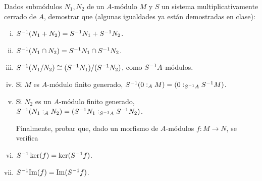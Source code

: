\documentclass[../../../main.tex]{subfiles}
\begin{document}
\setcounter{exercici}{64}
\begin{exercici}
Dados submódulos $N_1, N_2$ de un $A$-módulo $M$ y $S$ un sistema multiplicativamente cerrado de $A$, demostrar que (algunas igualdades ya están demostradas en clase):
\begin{enumerate}[(i)]
    \item $S^{-1} (N_1+N_2) = S^{-1} N_1+S^{-1} N_2$.
    \item $S^{-1} (N_1\cap N_2) = S^{-1} N_1\cap S^{-1} N_2$.
    \item $S^{-1} (N_1/N_2) \cong (S^{-1} N_1)/(S^{-1} N_2)$, como $S^{-1} A$-módulos.
    \item Si $M$ es $A$-módulo finito generado, $S^{-1}(0:_{A}M) = (0:_{S^{-1} A}S^{-1} M)$.
    \item Si $N_2$ es un $A$-módulo finito generado, $S^{-1}(N_1:_{A}N_2) = (S^{-1} N_1:_{S^{-1} A}S^{-1} N_2)$.
    
    Finalmente, probar que, dado un morfismo de $A$-módulos $f:M\to N$, se verifica
    \item $S^{-1}\ker(f) = \ker(S^{-1} f)$.
    \item $S^{-1}\mathrm{Im}(f) = \mathrm{Im}(S^{-1} f)$.
\end{enumerate}
\end{exercici}
\end{document}
